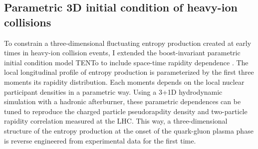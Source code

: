 \documentclass[12pt,a4paper]{article}
\begin{document}
\subsection{Parametric 3D initial condition of heavy-ion collisions}
To constrain a three-dimensional fluctuating entropy production created at early times in heavy-ion collision events, I extended the boost-invariant parametric initial condition model TENTo to include space-time rapidity dependence \cite{Ke:2016jrd}. The local longitudinal profile of entropy production is parameterized by the first three moments its rapidity distribution. Each moments depends on the local nuclear participant densities in a parametric way. Using a 3+1D hydrodynamic simulation with a hadronic afterburner, these parametric dependences can be tuned to reproduce the charged particle pseudorapdity density and two-particle rapidity correlation measured at the LHC. This way, a three-dimensional structure of the entropy production at the onset of the quark-gluon plasma phase is reverse engineered from experimental data for the first time. 



\end{document}
